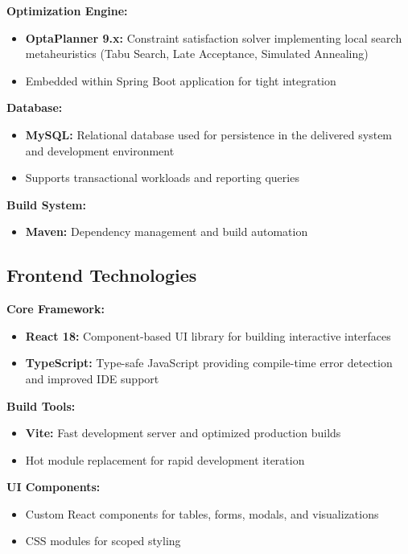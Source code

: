 \documentclass[12pt,a4paper]{report}
\begin{document}
\textbf{Optimization Engine:}
\begin{itemize}
    \item \textbf{OptaPlanner 9.x:} Constraint satisfaction solver implementing local search metaheuristics (Tabu Search, Late Acceptance, Simulated Annealing)
    \item Embedded within Spring Boot application for tight integration
\end{itemize}

\textbf{Database:}
\begin{itemize}
    \item \textbf{MySQL:} Relational database used for persistence in the delivered system and development environment
    \item Supports transactional workloads and reporting queries
\end{itemize}

\textbf{Build System:}
\begin{itemize}
    \item \textbf{Maven:} Dependency management and build automation
\end{itemize}

\subsection{Frontend Technologies}

\textbf{Core Framework:}
\begin{itemize}
    \item \textbf{React 18:} Component-based UI library for building interactive interfaces
    \item \textbf{TypeScript:} Type-safe JavaScript providing compile-time error detection and improved IDE support
\end{itemize}

\textbf{Build Tools:}
\begin{itemize}
    \item \textbf{Vite:} Fast development server and optimized production builds
    \item Hot module replacement for rapid development iteration
\end{itemize}

\textbf{UI Components:}
\begin{itemize}
    \item Custom React components for tables, forms, modals, and visualizations
    \item CSS modules for scoped styling
\end{itemize}
\end{document}
